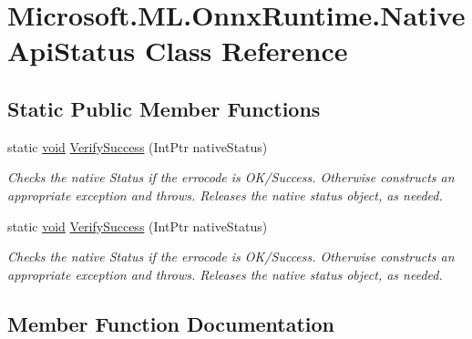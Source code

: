 \hypertarget{classMicrosoft_1_1ML_1_1OnnxRuntime_1_1NativeApiStatus}{}\section{Microsoft.\+M\+L.\+Onnx\+Runtime.\+Native\+Api\+Status Class Reference}
\label{classMicrosoft_1_1ML_1_1OnnxRuntime_1_1NativeApiStatus}
\subsection*{Static Public Member Functions}
\begin{DoxyCompactItemize}
\item 
static \mbox{\hyperlink{mlasi_8h_a88f941d423cb2a819b70a1358982b1a6}{void}} \mbox{\hyperlink{classMicrosoft_1_1ML_1_1OnnxRuntime_1_1NativeApiStatus_a1580510459f2d13ca056631528e28159}{Verify\+Success}} (Int\+Ptr native\+Status)
\begin{DoxyCompactList}\small\item\em Checks the native Status if the errocode is O\+K/\+Success. Otherwise constructs an appropriate exception and throws. Releases the native status object, as needed. \end{DoxyCompactList}\item 
static \mbox{\hyperlink{mlasi_8h_a88f941d423cb2a819b70a1358982b1a6}{void}} \mbox{\hyperlink{classMicrosoft_1_1ML_1_1OnnxRuntime_1_1NativeApiStatus_a1580510459f2d13ca056631528e28159}{Verify\+Success}} (Int\+Ptr native\+Status)
\begin{DoxyCompactList}\small\item\em Checks the native Status if the errocode is O\+K/\+Success. Otherwise constructs an appropriate exception and throws. Releases the native status object, as needed. \end{DoxyCompactList}\end{DoxyCompactItemize}


\subsection{Member Function Documentation}
\mbox{\label{classMicrosoft_1_1ML_1_1OnnxRuntime_1_1NativeApiStatus_a1580510459f2d13ca056631528e28159}} 
